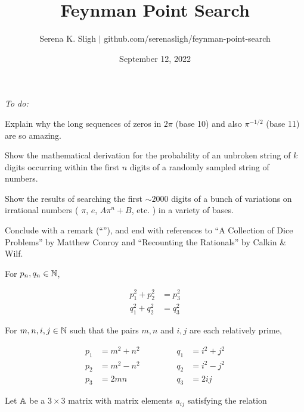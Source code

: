 \documentclass[12pt]{article}
\begin{document}
\title{Feynman Point Search}
\author{Serena K. Sligh $\big|$ github.com/serenasligh/feynman-point-search }
\date{September 12, 2022}

\maketitle


\textit{To do:}

\begin{subproblems}

\item Explain why the long sequences of zeros in $2\pi$ (base 10) and also $\pi^{-1/2}$ (base 11) are so amazing.

\item Show the mathematical derivation for the probability of an unbroken string of $k$ digits occurring within the first $n$ digits of a randomly sampled string of numbers.

\item Show the results of searching the first $\sim 2000$ digits of a bunch of variations on irrational numbers ( $\pi$, $e$, $A\pi^n + B$, etc. ) in a variety of bases.

\item Conclude with a remark (``''), and end with references to ``A Collection of Dice Problems'' by Matthew Conroy and ``Recounting the Rationals'' by Calkin \& Wilf.

\end{subproblems}



For $p_n, q_n \in \mathbb{N}$,

$$
\begin{aligned}
p_1^2 + p_2^2 &= p_3^2
\\
q_1^2 + q_2^2 &= q_3^2
\end{aligned}
$$

For $m, n, i, j \in \mathbb{N}$ such that the pairs $m, n$ and $i, j$ are each relatively prime,

$$
\begin{aligned}
p_1 &= m^2 + n^2 &\qquad&& q_1 &= i^2 + j^2
\\ p_2 &= m^2 - n^2 &\qquad&& q_2 &= i^2 - j^2
\\ p_3 &= 2mn &\qquad&& q_3 &= 2ij
\end{aligned}
$$

Let $\mathbb{A}$ be a $3 \times 3$ matrix with matrix elements $a_{ij}$ satisfying the relation
\end{document}
